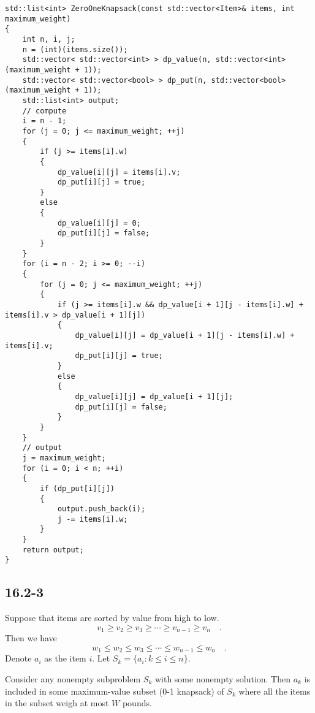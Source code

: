 \begin{verbatim}
std::list<int> ZeroOneKnapsack(const std::vector<Item>& items, int maximum_weight)
{
    int n, i, j;
    n = (int)(items.size());
    std::vector< std::vector<int> > dp_value(n, std::vector<int>(maximum_weight + 1));
    std::vector< std::vector<bool> > dp_put(n, std::vector<bool>(maximum_weight + 1));
    std::list<int> output;
    // compute
    i = n - 1;
    for (j = 0; j <= maximum_weight; ++j)
    {
        if (j >= items[i].w)
        {
            dp_value[i][j] = items[i].v;
            dp_put[i][j] = true;
        }
        else
        {
            dp_value[i][j] = 0;
            dp_put[i][j] = false;
        }
    }
    for (i = n - 2; i >= 0; --i)
    {
        for (j = 0; j <= maximum_weight; ++j)
        {
            if (j >= items[i].w && dp_value[i + 1][j - items[i].w] + items[i].v > dp_value[i + 1][j])
            {
                dp_value[i][j] = dp_value[i + 1][j - items[i].w] + items[i].v;
                dp_put[i][j] = true;
            }
            else
            {
                dp_value[i][j] = dp_value[i + 1][j];
                dp_put[i][j] = false;
            }
        }
    }
    // output
    j = maximum_weight;
    for (i = 0; i < n; ++i)
    {
        if (dp_put[i][j])
        {
            output.push_back(i);
            j -= items[i].w;
        }
    }
    return output;
}
\end{verbatim}
    
\subsection*{16.2-3}

Suppose that items are sorted by value from high to low.
\begin{equation*}
    v_1 \geq v_2 \geq v_3 \geq \cdots \geq v_{n-1} \geq v_n
    \quad .
\end{equation*}
Then we have 
\begin{equation*}
    w_1 \leq w_2 \leq w_3 \leq \cdots \leq w_{n-1} \leq w_n
    \quad .
\end{equation*}
Denote $a_i$ as the item $i$.
Let $S_k = \{ a_i : k \leq i \leq n \}$.

\begin{claim}
    Consider any nonempty subproblem $S_k$ with some nonempty solution.
    Then $a_k$ is included in some maximum-value subset (0-1 knapsack) of $S_k$
    where all the items in the subset weigh at most $W$ pounds.
\end{claim}


